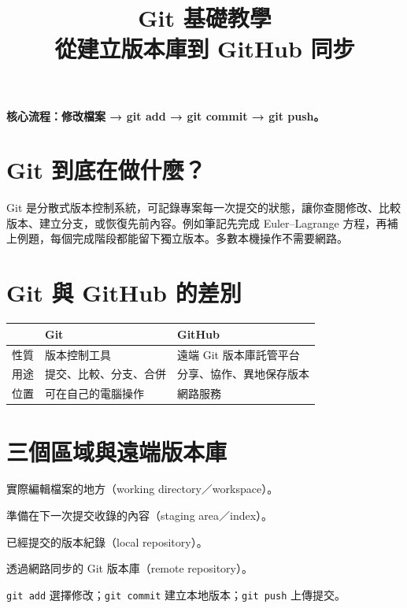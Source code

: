 \documentclass[UTF8,fontset=fandol,11pt,a4paper]{ctexart}
\title{Git 基礎教學\\\large 從建立版本庫到 GitHub 同步}
\author{}
\date{}
\begin{document}
\maketitle
\textbf{核心流程：修改檔案 → git add → git commit → git push。}
\tableofcontents
\newpage
\section{Git 到底在做什麼？}
Git 是分散式版本控制系統，可記錄專案每一次提交的狀態，讓你查閱修改、比較版本、建立分支，或恢復先前內容。例如筆記先完成 Euler--Lagrange 方程，再補上例題，每個完成階段都能留下獨立版本。多數本機操作不需要網路。
\section{Git 與 GitHub 的差別}
\begin{tabularx}{\linewidth}{lXX}\toprule
       & Git         & GitHub         \\\midrule
    性質 & 版本控制工具      & 遠端 Git 版本庫託管平台 \\
    用途 & 提交、比較、分支、合併 & 分享、協作、異地保存版本   \\
    位置 & 可在自己的電腦操作   & 網路服務           \\\bottomrule
\end{tabularx}
\section{三個區域與遠端版本庫}
\begin{description}[leftmargin=2cm]
    \item[工作目錄] 實際編輯檔案的地方（working directory／workspace）。
    \item[暫存區] 準備在下一次提交收錄的內容（staging area／index）。
    \item[本地版本庫] 已經提交的版本紀錄（local repository）。
    \item[遠端版本庫] 透過網路同步的 Git 版本庫（remote repository）。
\end{description}
\texttt{git add} 選擇修改；\texttt{git commit} 建立本地版本；\texttt{git push} 上傳提交。
\end{document}
